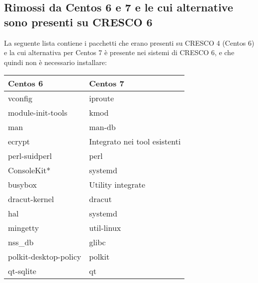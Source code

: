 \documentclass[11pt]{article}
\begin{document}
\subsection{Rimossi da Centos 6 e 7 e le cui alternative sono presenti su CRESCO 6}
La seguente lista contiene i pacchetti che erano presenti su CRESCO 4 (Centos 6) e la cui alternativa per Centos 7 è presente
nei sistemi di CRESCO 6, e che quindi non è necessario installare:
\begin{center}
	\renewcommand{\arraystretch}{1.5}
	\begin{tabular}{|l|l|}
		\hline
		\rowcolor{hgray}
		\textbf{Centos 6} & \textbf{Centos 7} \\
		\hline
		vconfig & iproute \\ \hline
		module-init-tools & kmod \\ \hline
		man & man-db \\ \hline
		ecrypt & Integrato nei tool esistenti \\ \hline
		perl-suidperl & perl \\ \hline
		ConsoleKit* & systemd \\ \hline
		busybox & Utility integrate \\ \hline
		dracut-kernel & dracut \\ \hline
		hal & systemd \\ \hline
		mingetty & util-linux \\ \hline
		nss\_db & glibc \\ \hline
		polkit-desktop-policy & polkit \\ \hline
		qt-sqlite & qt \\ \hline
	\end{tabular}
\end{center}
\end{document}
